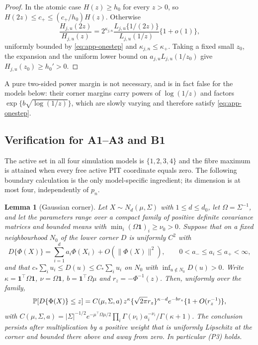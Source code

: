 \documentclass[bj,authoryear]{imsart}
\theoremstyle{plain}
\newtheorem{lemma}[theorem]{Lemma}
\begin{document}
\begin{appendix}
\begin{proof}
In the atomic case $H(z)\ge h_0$ for every $z>0$, so
$H(2z)\le c_+\le(c_+/h_0)H(z)$. Otherwise
\[
 \frac{H_{j,u}(2z)}{H_{j,u}(z)}
 =2^{\kappa_{j,n}}\frac{L_{j,u}\{1/(2z)\}}{L_{j,u}(1/z)}\{1+o(1)\},
\]
uniformly bounded by \eqref{eq:app-onestep} and $\kappa_{j,n}\le\kappa_+$.
Taking a fixed small $z_0$, the expansion and the uniform lower bound on
$a_{j,u}L_{j,u}(1/z_0)$ give $H_{j,u}(z_0)\ge h_0'>0$.
\end{proof}

A pure two-sided power margin is not necessary, and is in fact false for
the models below: their corner margins carry powers of $\log(1/z)$ and
factors $\exp\{b\sqrt{\log(1/z)}\}$, which are slowly varying and
therefore satisfy \eqref{eq:app-onestep}.

\subsection{Verification for A1--A3 and B1}

The active set in all four simulation models is $\{1,2,3,4\}$ and the
fibre maximum is attained when every free active PIT coordinate equals
zero. The following boundary calculation is the only model-specific
ingredient; its dimension is at most four, independently of $p_n$.

\begin{lemma}[Gaussian corner]\label{lem:app-corner}
Let $X\sim N_d(\mu,\Sigma)$ with $1\le d\le d_0$, let $\Omega=\Sigma^{-1}$,
and let the parameters range over a compact family of positive definite
covariance matrices and bounded means with
$\min_i(\Omega\mathbf 1)_i\ge\nu_0>0$. Suppose that on a fixed
neighbourhood $N_0$ of the lower corner $D$ is uniformly $C^2$ with
\[
 D\{\Phi(X)\}=\sum_{i=1}^da_i\Phi(X_i)+O(\|\Phi(X)\|^2),
 \qquad 0<a_-\le a_i\le a_+<\infty,
\]
and that $c_*\sum_iu_i\le D(u)\le C_*\sum_iu_i$ on $N_0$ with
$\inf_{u\notin N_0}D(u)>0$. Write $\kappa=\mathbf 1^\top\Omega\mathbf 1$,
$\nu=\Omega\mathbf 1$, $b=\mathbf 1^\top\Omega\mu$ and
$r_z=-\Phi^{-1}(z)$. Then, uniformly over the family,
\begin{equation}\label{eq:app-corner}
 \mathbb P[D\{\Phi(X)\}\le z]
 =C(\mu,\Sigma,a)\,z^{\kappa}\{\sqrt{2\pi}r_z\}^{\kappa-d}e^{-br_z}
 \{1+O(r_z^{-1})\},
\end{equation}
with
$C(\mu,\Sigma,a)=|\Sigma|^{-1/2}e^{-\mu^\top\Omega\mu/2}
\prod_i\Gamma(\nu_i)a_i^{-\nu_i}/\Gamma(\kappa+1)$.
The conclusion persists after multiplication by a positive weight that
is uniformly Lipschitz at the corner and bounded there above and away
from zero. In particular (P3) holds.
\end{lemma}


\end{appendix}
\end{document}
